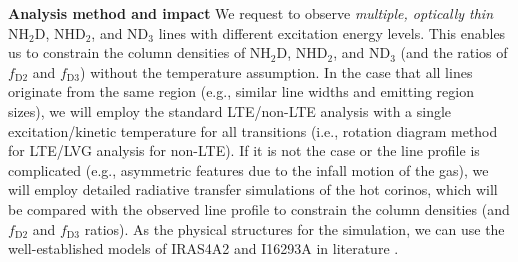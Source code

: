\documentclass[12pt,a4paper]{article}  %
\begin{document}
    

\smallskip
\noindent \textbf{Analysis method and impact} \quad We request to observe \emph{multiple, optically thin} NH$_2$D, NHD$_2$, and ND$_3$ lines with different excitation energy levels. This enables us to constrain the column densities of NH$_2$D, NHD$_2$, and ND$_3$ (and the ratios of $f_\mathrm{D2}$ and $f_\mathrm{D3}$) without the temperature assumption. In the case that all lines originate from the same region (e.g., similar line widths and emitting region sizes), we will employ the standard LTE/non-LTE analysis with a single excitation/kinetic temperature for all transitions (i.e., rotation diagram method for LTE/LVG analysis for non-LTE). If it is not the case or the line profile is complicated (e.g., asymmetric features due to the infall motion of the gas), we will employ detailed radiative transfer simulations of the hot corinos, which will be compared with the observed line profile to constrain the column densities (and $f_\mathrm{D2}$ and $f_\mathrm{D3}$ ratios). As the physical structures for the simulation, we can use the well-established models of IRAS4A2 and I16293A in literature \citep[e.g.,][]{Persson16, Jacobsen18}. %
\end{document}
